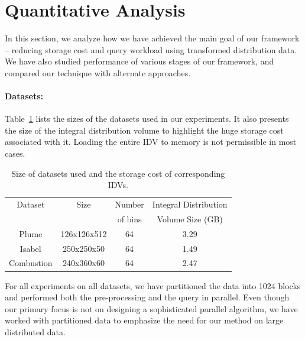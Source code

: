 \section{Quantitative Analysis}
\label{sec:analysis}
In this section, we analyze how we have achieved the main goal of our framework -- reducing storage cost and query workload using transformed distribution data. We have also studied performance of various stages of our framework, and compared our technique with alternate approaches.

\paragraph*{Datasets:} Table~\ref{tbl:datasets} lists the sizes of the datasets used in our experiments. It also presents the size of the integral distribution volume to highlight the huge storage cost associated with it. Loading the entire IDV to memory is not permissible in most cases.
\begin{table}[!htb]
	\centering	
	\renewcommand{\tabcolsep}{0.09cm}
	\begin{tabular}{|c|c|c|c|}
		\hline
		{\small Dataset} & {\small Size} & {\small Number} & {\small Integral Distribution}\\		
		{\small } & {\small } & {\small of bins} & {\small Volume Size (GB)}\\		
		\hline			
		{\small Plume} & {\small 126x126x512} & {\small 64} & {\small 3.29}\\
		{\small Isabel} & {\small 250x250x50} & {\small 64} & {\small 1.49}\\
		{\small Combustion} & {\small 240x360x60} & {\small 64} & {\small 2.47}\\
		\hline		
	\end{tabular}
	\vspace{-0.3cm}	
	\caption{\label{tbl:datasets} Size of datasets used and the storage cost of corresponding IDVs.}
\end{table}

For all experiments on all datasets, we have partitioned the data into 1024 blocks and performed both the pre-processing and the query in parallel. Even though our primary focus is not on designing a sophisticated parallel algorithm, we have worked with partitioned data to emphasize the need for our method on large distributed data.

